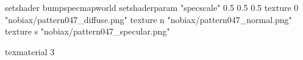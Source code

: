 setshader bumpspecmapworld
setshaderparam "specscale" 0.5 0.5 0.5
   texture 0 "nobiax/pattern047_diffuse.png"
   texture n "nobiax/pattern047_normal.png"
   texture s "nobiax/pattern047_specular.png"

texmaterial 3
